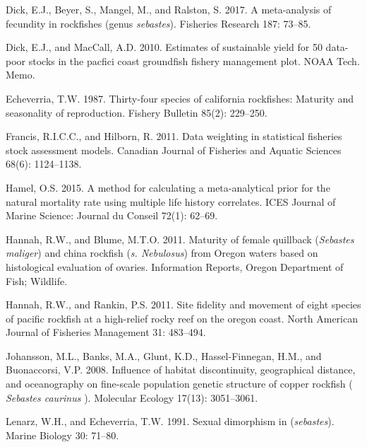 \documentclass[11pt,
  english,
  letterpaper,
]{article}
\begin{document}
\leavevmode\hypertarget{ref-dick_meta-analysis_2017}{}%
Dick, E.J., Beyer, S., Mangel, M., and Ralston, S. 2017. A meta-analysis of fecundity in rockfishes (genus \emph{sebastes}). Fisheries Research 187: 73--85.

\leavevmode\hypertarget{ref-DickandMacCall_dbsra_2010}{}%
Dick, E.J., and MacCall, A.D. 2010. Estimates of sustainable yield for 50 data-poor stocks in the pacfici coast groundfish fishery management plot. NOAA Tech. Memo.

\leavevmode\hypertarget{ref-Echeverria_maturity_1987}{}%
Echeverria, T.W. 1987. Thirty-four species of california rockfishes: Maturity and seasonality of reproduction. Fishery Bulletin 85(2): 229--250.

\leavevmode\hypertarget{ref-francis_data_2011}{}%
Francis, R.I.C.C., and Hilborn, R. 2011. Data weighting in statistical fisheries stock assessment models. Canadian Journal of Fisheries and Aquatic Sciences 68(6): 1124--1138.

\leavevmode\hypertarget{ref-hamel_method_2015}{}%
Hamel, O.S. 2015. A method for calculating a meta-analytical prior for the natural mortality rate using multiple life history correlates. ICES Journal of Marine Science: Journal du Conseil 72(1): 62--69.

\leavevmode\hypertarget{ref-HannahandBlume_maturity_2011}{}%
Hannah, R.W., and Blume, M.T.O. 2011. Maturity of female quillback (\emph{Sebastes maliger}) and china rockfish (\emph{s. Nebulosus}) from Oregon waters based on histological evaluation of ovaries. Information Reports, Oregon Department of Fish; Wildlife.

\leavevmode\hypertarget{ref-HannahandRankin_rockfish_site_fidelity_2011}{}%
Hannah, R.W., and Rankin, P.S. 2011. Site fidelity and movement of eight species of pacific rockfish at a high-relief rocky reef on the oregon coast. North American Journal of Fisheries Management 31: 483--494.

\leavevmode\hypertarget{ref-johansson_influence_2008}{}%
Johansson, M.L., Banks, M.A., Glunt, K.D., Hassel-Finnegan, H.M., and Buonaccorsi, V.P. 2008. Influence of habitat discontinuity, geographical distance, and oceanography on fine-scale population genetic structure of copper rockfish ( \emph{Sebastes caurinus} ). Molecular Ecology 17(13): 3051--3061.

\leavevmode\hypertarget{ref-LenarzandEcheverria_dimorphism_1991}{}%
Lenarz, W.H., and Echeverria, T.W. 1991. Sexual dimorphism in (\emph{sebastes}). Marine Biology 30: 71--80.
\end{document}
